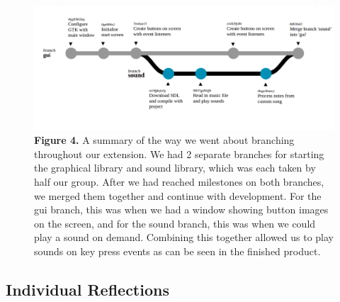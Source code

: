 \documentclass[11pt]{article}
\begin{document}
\newpage

\begin{figure}[h]
  \vspace{1em}
  \centering
  \includegraphics[width=35em]{branch_full}
  \setlength{\belowcaptionskip}{2em}
  \captionsetup{justification=justified,singlelinecheck=false}
  \caption*{\fontsize{9}{9}\selectfont\textbf{Figure 4.} A summary of the way we went about branching throughout our extension. We had 2 separate branches for starting the graphical library and sound library, which was each taken by half our group. After we had reached milestones on both branches, we merged them together and continue with development. For the gui branch, this was when we had a window showing button images on the screen, and for the sound branch, this was when we could play a sound on demand. Combining this together allowed us to play sounds on key press events as can be seen in the finished product. }
\end{figure}

\subsection{Individual Reflections}
\end{document}
